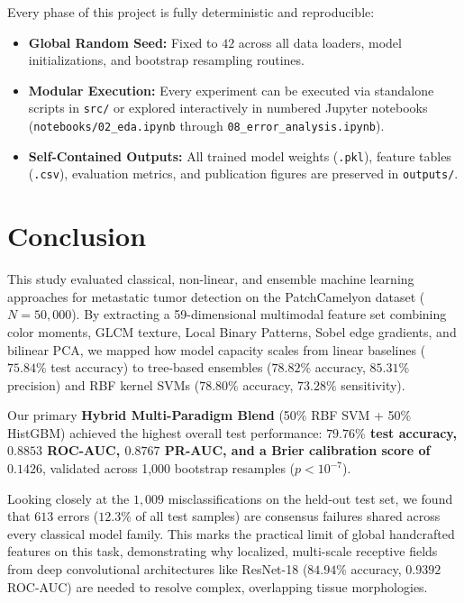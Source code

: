 \documentclass[11pt,a4paper]{article}
\begin{document}
Every phase of this project is fully deterministic and reproducible:
\begin{itemize}[noitemsep]
    \item \textbf{Global Random Seed:} Fixed to $42$ across all data loaders, model initializations, and bootstrap resampling routines.
    \item \textbf{Modular Execution:} Every experiment can be executed via standalone scripts in \texttt{src/} or explored interactively in numbered Jupyter notebooks (\texttt{notebooks/02\_eda.ipynb} through \texttt{08\_error\_analysis.ipynb}).
    \item \textbf{Self-Contained Outputs:} All trained model weights (\texttt{.pkl}), feature tables (\texttt{.csv}), evaluation metrics, and publication figures are preserved in \texttt{outputs/}.
\end{itemize}


\section{Conclusion}
This study evaluated classical, non-linear, and ensemble machine learning approaches for metastatic tumor detection on the PatchCamelyon dataset ($N=50,000$). By extracting a 59-dimensional multimodal feature set combining color moments, GLCM texture, Local Binary Patterns, Sobel edge gradients, and bilinear PCA, we mapped how model capacity scales from linear baselines ($75.84\%$ test accuracy) to tree-based ensembles ($78.82\%$ accuracy, $85.31\%$ precision) and RBF kernel SVMs ($78.80\%$ accuracy, $73.28\%$ sensitivity).

Our primary \textbf{Hybrid Multi-Paradigm Blend} (50\% RBF SVM + 50\% HistGBM) achieved the highest overall test performance: \textbf{$79.76\%$ test accuracy, $0.8853$ ROC-AUC, $0.8767$ PR-AUC, and a Brier calibration score of $0.1426$}, validated across 1,000 bootstrap resamples ($p < 10^{-7}$).

Looking closely at the $1,009$ misclassifications on the held-out test set, we found that $613$ errors ($12.3\%$ of all test samples) are consensus failures shared across every classical model family. This marks the practical limit of global handcrafted features on this task, demonstrating why localized, multi-scale receptive fields from deep convolutional architectures like ResNet-18 ($84.94\%$ accuracy, $0.9392$ ROC-AUC) are needed to resolve complex, overlapping tissue morphologies.
\end{document}
